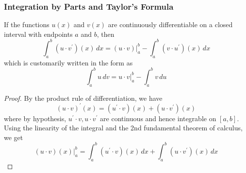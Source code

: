     \subsubsection{Integration by Parts and Taylor's Formula}
    \begin{theorem}
    If the functions $u(x)$ and $v(x)$ are continuously differentiable on a closed interval with endpoints $a$ and $b$, then
    \[\int_a^b (u \cdot v^\prime)(x)\,dx = (u \cdot v)\big|^b_a - \int_a^b (v \cdot u^\prime)(x)\,dx\]
    which is customarily written in the form as
    \[\int_a^b u\,dv = u \cdot v \big|_a^b - \int_a^b v\,du\]
    \end{theorem}
    \begin{proof}
    By the product rule of differentiation, we have
    \[(u \cdot v)^\prime (x) = (u^\prime \cdot v)(x) + (u \cdot v^\prime) (x)\]
    where by hypothesis, $u^\prime \cdot v, u \cdot v^\prime$ are continuous and hence integrable on $[a, b]$. Using the linearity of the integral and the 2nd fundamental theorem of calculus, we get
    \[(u \cdot v) (x) \big|^b_a = \int_a^b (u^\prime \cdot v)(x)\,dx + \int_a^b (u \cdot v^\prime) (x)\,dx\]
    \end{proof}


